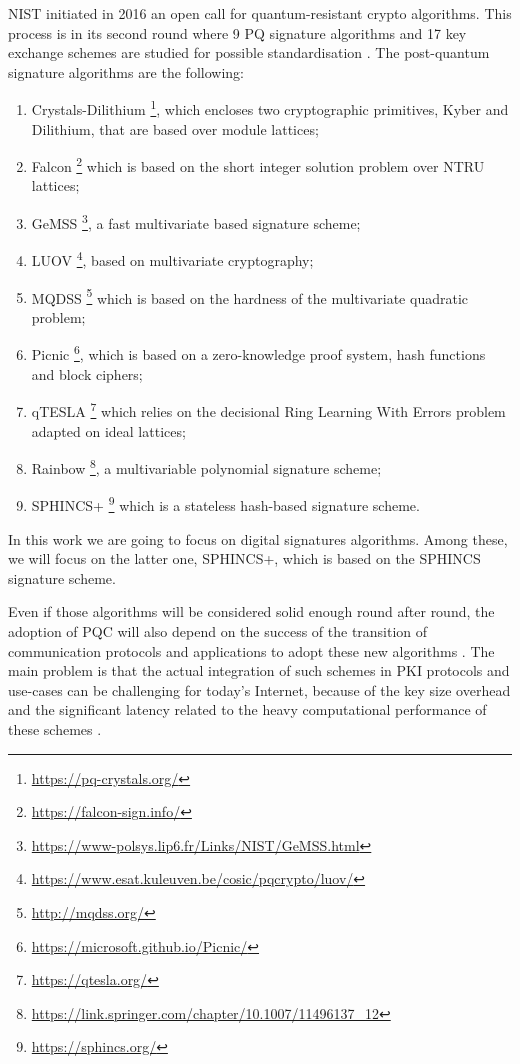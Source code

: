 \documentclass[a4paper,12pt]{article}
\begin{document}
NIST initiated in 2016 an open call for quantum-resistant crypto algorithms. This process is in its second round where 9 PQ signature algorithms and 17 key exchange schemes are studied for possible standardisation \cite{18_NISTreport}. 
The post-quantum signature algorithms are the following:
\begin{enumerate}
	\item Crystals-Dilithium \footnote{\url{https://pq-crystals.org/}}, which encloses two cryptographic primitives, Kyber and Dilithium, that are based over module lattices; 
	\item Falcon \footnote{\url{https://falcon-sign.info/}} which is based on the short integer solution problem over NTRU lattices;
	\item GeMSS \footnote{\url{https://www-polsys.lip6.fr/Links/NIST/GeMSS.html}}, a fast multivariate based signature scheme;
	\item LUOV \footnote{\url{https://www.esat.kuleuven.be/cosic/pqcrypto/luov/}}, based on multivariate cryptography;
	\item MQDSS \footnote{\url{http://mqdss.org/}} which is based on the hardness of the multivariate quadratic problem;
	\item Picnic \footnote{\url{https://microsoft.github.io/Picnic/}}, which is based on a zero-knowledge proof system, hash functions and block ciphers;
	\item qTESLA \footnote{\url{https://qtesla.org/}} which relies on the decisional Ring Learning With Errors problem adapted on ideal lattices;
	\item Rainbow \footnote{\url{https://link.springer.com/chapter/10.1007/11496137_12}}, a multivariable polynomial signature scheme;
	\item SPHINCS+ \footnote{\url{https://sphincs.org/}} which is a stateless hash-based signature scheme.
\end{enumerate}

In this work we are going to focus on digital signatures algorithms. Among these, we will focus on the latter one, SPHINCS+, which is based on the SPHINCS signature scheme.

Even if those algorithms will be considered solid enough round after round, the adoption of PQC will also depend on the success of the transition of communication protocols and applications to adopt these new algorithms \cite{6_NISTPQC_TLS_SSH}. The main problem is that the actual integration of such schemes in PKI protocols and use-cases can be challenging for today's Internet, because of the key size overhead and the significant latency related to the heavy computational performance of these schemes \cite{5_postquantum_signature_usecase}.
\end{document}
